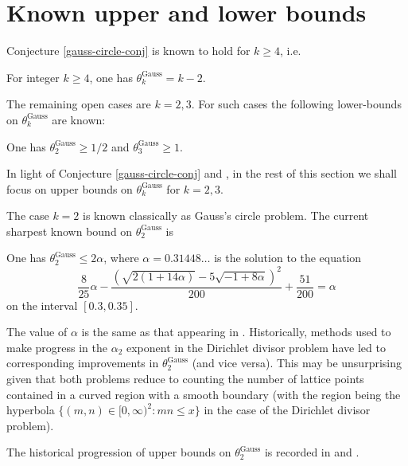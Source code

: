 \section{Known upper and lower bounds}

Conjecture \ref{gauss-circle-conj} is known to hold for $k \ge 4$, i.e.

\begin{theorem}
For integer $k \ge 4$, one has $\theta^{\operatorname{Gauss}}_{k} = k - 2$.
\end{theorem}

The remaining open cases are $k = 2, 3$. For such cases the following lower-bounds on $\theta^{\operatorname{Gauss}}_{k}$ are known:

\begin{theorem}\label{gauss-circle-lower-23}
One has $\theta^{\operatorname{Gauss}}_{2} \ge 1/2$ and $\theta^{\operatorname{Gauss}}_{3} \ge 1$.
\end{theorem}

In light of Conjecture \ref{gauss-circle-conj} and , in the rest of this section we shall focus on upper bounds on $\theta^{\operatorname{Gauss}}_{k}$ for $k = 2, 3$.

The case $k = 2$ is known classically as Gauss's circle problem. The current sharpest known bound on $\theta_2^{\operatorname{Gauss}}$ is
\begin{theorem} 
One has $\theta_2^{\operatorname{Gauss}} \le 2\alpha$, where $\alpha = 0.31448\ldots$ is the solution to the equation
\[
\frac{8}{25}\alpha - \frac{(\sqrt{2(1+14\alpha)} - 5\sqrt{-1+8\alpha})^2}{200} + \frac{51}{200} = \alpha
\]
on the interval $[0.3, 0.35]$.
\end{theorem}

\begin{remark}
The value of $\alpha$ is the same as that appearing in . Historically, methods used to make progress in the $\alpha_2$ exponent in the Dirichlet divisor problem have led to corresponding improvements in $\theta_2^{\operatorname{Gauss}}$ (and vice versa). This may be unsurprising given that both problems reduce to counting the number of lattice points contained in a curved region with a smooth boundary (with the region being the hyperbola $\{(m,n) \in [0, \infty)^2: mn \le x \}$ in the case of the Dirichlet divisor problem).
\end{remark}

The historical progression of upper bounds on $\theta_2^{\operatorname{Gauss}}$ is recorded in  and .


